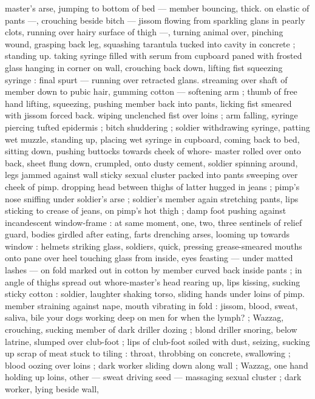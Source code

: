 master's arse, jumping to bottom of bed --- member bouncing, thick. 
on elastic of pants ---, crouching beside bitch --- jissom flowing from 
sparkling glans in pearly clots, running over hairy surface of thigh 
---, turning animal over, pinching wound, grasping back leg, 
squashing tarantula tucked into cavity in concrete ; standing up. 
taking syringe filled with serum from cupboard paned with frosted 
glass hanging in corner on wall, crouching back down, lifting fist 
squeezing syringe : final spurt --- running over retracted glans. 
streaming over shaft of member down to pubic hair, gumming cotton 
--- softening arm ; thumb of free hand lifting, squeezing, pushing 
member back into pants, licking fist smeared with jissom forced back. 
wiping unclenched fist over loins ; arm falling, syringe piercing tufted 
epidermis ; bitch shuddering ; soldier withdrawing syringe, patting 
wet muzzle, standing up, placing wet syringe in cupboard, coming 
back to bed, sitting down, pushing buttocks towards cheek of whore- 
master rolled over onto back, sheet flung down, crumpled, onto 
dusty cement, soldier spinning around, legs jammed against wall 
sticky sexual cluster packed into pants sweeping over cheek of pimp. 
dropping head between thighs of latter hugged in jeans ; pimp's 
nose sniffing under soldier's arse ; soldier's member again 
stretching pants, lips sticking to crease of jeans, on pimp's hot thigh 
; damp foot pushing against incandescent window-frame : at same 
moment, one, two, three sentinels of relief guard, bodies girdled 
after eating, farts drenching arses, looming up towards window : 
helmets striking glass, soldiers, quick, pressing grease-smeared 
mouths onto pane over heel touching glass from inside, eyes 
feasting --- under matted lashes --- on fold marked out in cotton by 
member curved back inside pants ; in angle of thighs spread out 
whore-master's head rearing up, lips kissing, sucking sticky cotton : 
soldier, laughter shaking torso, sliding hands under loins of pimp. 
member straining against nape, mouth vibrating in fold : {\thd} {\gl} jissom, 
blood, sweat, saliva, bile{\td} your dogs working deep on men{\thd} for 
when the lymph?{\td} {\gr} ; Wazzag, crouching, sucking member of dark 
driller dozing ; blond driller snoring, below latrine, slumped over 
club-foot ; lips of club-foot soiled with dust, seizing, sucking up 
scrap of meat stuck to tiling : throat, throbbing on concrete, 
swallowing ; blood oozing over loins ; dark worker sliding down along 
wall ; Wazzag, one hand holding up loins, other --- sweat driving 
seed --- massaging sexual cluster ; dark worker, lying beside wall, 
